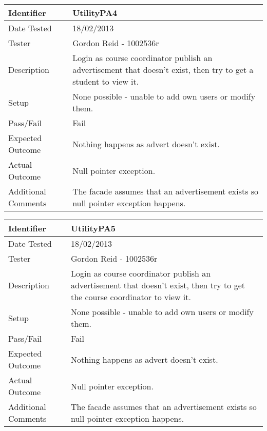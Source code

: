 \begin{tabularx}{\textwidth}{|T|L|}
\hline
Identifier & UtilityPA4\\
\hline
Date Tested & 18/02/2013\\
\hline
Tester & Gordon Reid - 1002536r\\
\hline
Description & Login as course coordinator publish an advertisement that
doesn't exist, then try to get a student to view it.\\
\hline
Setup & None possible - unable to add own users or modify them.\\
\hline
Pass/Fail & Fail\\
\hline
Expected Outcome & Nothing happens as advert doesn't exist.\\
\hline
Actual Outcome & Null pointer exception.\\
\hline
Additional Comments & The facade assumes that an advertisement exists so
null pointer exception happens.\\
\hline
\end{tabularx}

\vspace{2em}

\begin{tabularx}{\textwidth}{|T|L|}
\hline
Identifier & UtilityPA5\\
\hline
Date Tested & 18/02/2013\\
\hline
Tester & Gordon Reid - 1002536r\\
\hline
Description & Login as course coordinator publish an advertisement that
doesn't exist, then try to get the course coordinator to view it.\\
\hline
Setup & None possible - unable to add own users or modify them.\\
\hline
Pass/Fail & Fail\\
\hline
Expected Outcome & Nothing happens as advert doesn't exist.\\
\hline
Actual Outcome & Null pointer exception.\\
\hline
Additional Comments & The facade assumes that an advertisement exists so
null pointer exception happens.\\
\hline
\end{tabularx}

\vspace{2em}

